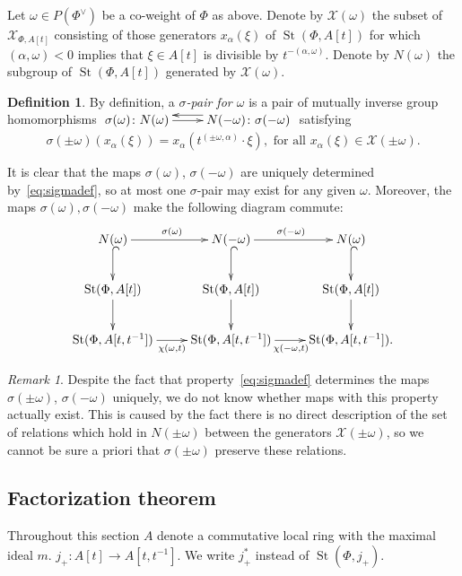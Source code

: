 \documentclass[oneside, 10pt]{amsart}
\DeclareMathOperator{\St}{St}
\newcommand{\XX}{\mathcal{X}}           %
\numberwithin{equation}{section}
\numberwithin{lemma}{section}
\theoremstyle{definition}
\newtheorem{dfn}[lemma]{Definition}
\theoremstyle{remark}
\newtheorem{rem}[lemma]{Remark}
\begin{document}
Let $\omega \in P(\Phi^\vee)$ be a co-weight of $\Phi$ as above.
Denote by $\XX(\omega)$ the subset of $\XX_{\Phi, A[t]}$ consisting of those generators $x_{\alpha}(\xi)$ of $\St(\Phi, A[t])$ for which 
$(\alpha, \omega) < 0$ implies that $\xi \in A[t]$ is divisible by $t^{-(\alpha, \omega)}$. Denote by $N(\omega)$ the subgroup of $\St(\Phi, A[t])$ generated by $\XX(\omega)$.

\begin{dfn} \label{dfn:sigma-pair}
By definition, a {\it $\sigma$-pair for $\omega$} is a pair of mutually inverse group homomorphisms 
$\xymatrix{ \sigma(\omega)\colon N(\omega) \ar[r] & \ar@<-1.0ex>[l] N(-\omega)\colon \sigma(-\omega) }$ satisfying
\begin{equation} \label{eq:sigmadef}
\sigma(\pm \omega)(x_\alpha(\xi)) = x_\alpha(t^{(\pm \omega, \alpha)}\cdot \xi), 
 \text{ for all } x_\alpha(\xi) \in \XX(\pm\omega).
\end{equation}\end{dfn}
It is clear that the maps $\sigma(\omega)$, $\sigma(-\omega)$ are uniquely determined by~\eqref{eq:sigmadef}, so at most one $\sigma$-pair may exist for any given $\omega$.
Moreover, the maps $\sigma(\omega), \sigma(-\omega)$ make the following diagram commute:
\begin{equation} \label{eq:sigma-diagram}
\xymatrix{ N(\omega) \ar[r]^{\sigma(\omega)}\ar@{^{(}->}[d] & N(-\omega) \ar@{^{(}->}[d] \ar[r]^{\sigma(-\omega)} & N(\omega) \ar@{^{(}->}[d] \\ 
          \St(\Phi, A[t]) \ar[d] & \St(\Phi, A[t]) \ar[d] & \St(\Phi, A[t]) \ar[d] \\
          \St(\Phi, A[t, t^{-1}]) \ar@<-0.0ex>[r]_{\chi(\omega, t)} & \St(\Phi, A[t, t^{-1}]) \ar@<-0.0ex>[r]_{\chi(-\omega, t)} & \St(\Phi, A[t, t^{-1}]).} \end{equation}  

\begin{rem} Despite the fact that property~\eqref{eq:sigmadef} determines the maps $\sigma(\pm \omega)$, $\sigma(-\omega)$ uniquely, 
 we do not know whether maps with this property actually exist.
This is caused by the fact there is no direct description of the set of relations which hold in $N(\pm\omega)$ between the generators $\XX(\pm\omega)$, 
 so we cannot be sure a priori that $\sigma(\pm\omega)$ preserve these relations. \end{rem}

\subsection{Factorization theorem} 
Throughout this section $A$ denote a commutative local ring with the maximal ideal $m$.
$j_+\colon A[t] \to A[t, t^{-1}]$. We write $j_+^*$ instead of $\St(\Phi, j_+)$.
 
\end{document}
